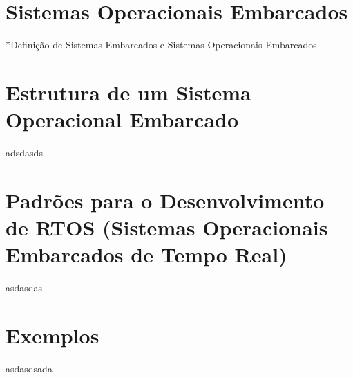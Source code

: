 \section{Sistemas Operacionais Embarcados}


*Definição de Sistemas Embarcados e Sistemas Operacionais Embarcados

\section{Estrutura de um Sistema Operacional Embarcado}

adsdasds

\section{Padrões para o Desenvolvimento de RTOS (Sistemas Operacionais Embarcados de Tempo Real) }

asdasdas

\section{Exemplos}

asdasdsada

